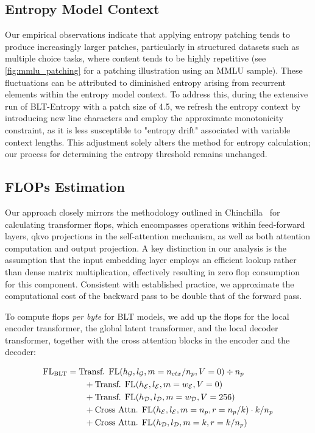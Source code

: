 \subsection{Entropy Model Context}
\label{section:entropy-context}
Our empirical observations indicate that applying entropy patching tends to produce increasingly larger patches, particularly in structured datasets such as multiple choice tasks, where content tends to be highly repetitive (see \autoref{fig:mmlu_patching} for a patching illustration using an MMLU sample). These fluctuations can be attributed to diminished entropy arising from recurrent elements within the entropy model context. To address this, during the extensive run of {\textsc BLT}-Entropy with a patch size of 4.5, we refresh the entropy context by introducing new line characters and employ the approximate monotonicity constraint, as it is less susceptible to "entropy drift" associated with variable context lengths. This adjustment solely alters the method for entropy calculation; our process for determining the entropy threshold remains unchanged.

\subsection{FLOPs Estimation} 
\label{section:flops}

Our approach closely mirrors the methodology outlined in Chinchilla~\citep{hoffmann2022training} for calculating transformer flops, which encompasses operations within feed-forward layers, qkvo projections in the self-attention mechanism, as well as both attention computation and output projection. A key distinction in our analysis is the assumption that the input embedding layer employs an efficient lookup rather than dense matrix multiplication, effectively resulting in zero flop consumption for this component. Consistent with established practice, we approximate the computational cost of the backward pass to be double that of the forward pass.

To compute flops \textit{per byte} for {\textsc BLT} models, we add up the flops for the local encoder transformer, the global latent transformer, and the local decoder transformer, together with the cross attention blocks in the encoder and the decoder:

\begin{align}
    \text{FL}_{\text{{\textsc BLT}}} &= \text{Transf. FL}(h_{\mathcal{G}}, l_{\mathcal{G}}, m=n_{ctx}/n_p, V=0) \div n_p\\
   &\qquad + \text{Transf. FL}(h_{\mathcal{E}}, l_{\mathcal{E}}, m=w_{\mathcal{E}}, V=0) \\
   &\qquad + \text{Transf. FL}(h_{\mathcal{D}}, l_{\mathcal{D}}, m=w_{\mathcal{D}}, V=256) \\ 
    &\qquad + \text{Cross Attn. FL}(h_{\mathcal{E}}, l_{\mathcal{E}}, m=n_p, r=n_p/k) \cdot k/n_p \\ 
   &\qquad + \text{Cross Attn. FL}(h_{\mathcal{D}}, l_{\mathcal{D}}, m=k, r=k/n_p)
\end{align}

